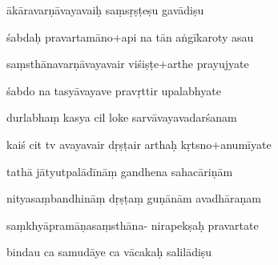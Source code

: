 \documentclass[article,12pt,a4paper]{memoir}%
\newcounter{parCount}
\begin{document}
	  
	  \pstart {} ākāravarṇāvayavaiḥ saṃsṛṣṭeṣu gavādiṣu 
	{}
	\pend%
      

	  
	  \pstart \leavevmode%
	śabdaḥ pravartamāno+api na tān aṅgīkaroty asau 
	{}
	\pend%
      

	  
	  \pstart {} saṃsthānavarṇāvayavair viśiṣṭe+arthe prayujyate 
	{}
	\pend%
      

	  
	  \pstart \leavevmode%
	śabdo na tasyāvayave pravṛttir upalabhyate 
	{}
	\pend%
      

	  
	  \pstart {} durlabhaṃ kasya cil loke sarvāvayavadarśanam 
	{}
	\pend%
      

	  
	  \pstart \leavevmode%
	kaiś cit tv avayavair dṛṣṭair arthaḥ kṛtsno+anumīyate 
	{}
	\pend%
      

	  
	  \pstart {} tathā jātyutpalādīnāṃ gandhena sahacāriṇām 
	{}
	\pend%
      

	  
	  \pstart \leavevmode%
	nityasaṃbandhināṃ dṛṣṭaṃ guṇānām avadhāraṇam 
	{}
	\pend%
      

	  
	  \pstart {} saṃkhyāpramāṇasaṃsthāna- nirapekṣaḥ pravartate 
	{}
	\pend%
      

	  
	  \pstart \leavevmode%
	bindau ca samudāye ca vācakaḥ salilādiṣu 
	{}
	\pend%
      
\end{document}
